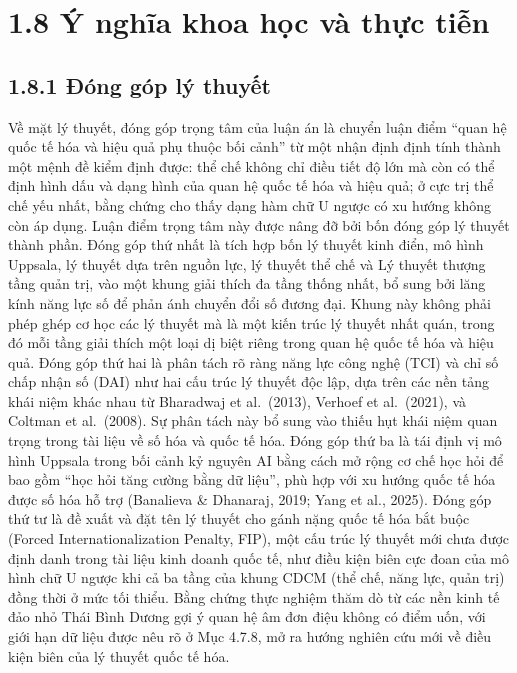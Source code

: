 \documentclass[
  a4paper,
  13pt]{extreport}
\begin{document}
\hypertarget{uxfd-nghux129a-khoa-hux1ecdc-vuxe0-thux1ef1c-tiux1ec5n}{%
\section{1.8 Ý nghĩa khoa học và thực
tiễn}\label{uxfd-nghux129a-khoa-hux1ecdc-vuxe0-thux1ef1c-tiux1ec5n}}

\hypertarget{ux111uxf3ng-guxf3p-luxfd-thuyux1ebft}{%
\subsection{1.8.1 Đóng góp lý
thuyết}\label{ux111uxf3ng-guxf3p-luxfd-thuyux1ebft}}

Về mặt lý thuyết, đóng góp trọng tâm của luận án là chuyển luận điểm
``quan hệ quốc tế hóa và hiệu quả phụ thuộc bối cảnh'' từ một nhận định
định tính thành một mệnh đề kiểm định được: thể chế không chỉ điều tiết
độ lớn mà còn có thể định hình dấu và dạng hình của quan hệ quốc tế hóa
và hiệu quả; ở cực trị thể chế yếu nhất, bằng chứng cho thấy dạng hàm
chữ U ngược có xu hướng không còn áp dụng. Luận điểm trọng tâm này được
nâng đỡ bởi bốn đóng góp lý thuyết thành phần. Đóng góp thứ nhất là tích
hợp bốn lý thuyết kinh điển, mô hình Uppsala, lý thuyết dựa trên nguồn
lực, lý thuyết thể chế và Lý thuyết thượng tầng quản trị, vào một khung
giải thích đa tầng thống nhất, bổ sung bởi lăng kính năng lực số để phản
ánh chuyển đổi số đương đại. Khung này không phải phép ghép cơ học các
lý thuyết mà là một kiến trúc lý thuyết nhất quán, trong đó mỗi tầng
giải thích một loại dị biệt riêng trong quan hệ quốc tế hóa và hiệu quả.
Đóng góp thứ hai là phân tách rõ ràng năng lực công nghệ (TCI) và chỉ số
chấp nhận số (DAI) như hai cấu trúc lý thuyết độc lập, dựa trên các nền
tảng khái niệm khác nhau từ Bharadwaj et al.~(2013), Verhoef et
al.~(2021), và Coltman et al.~(2008). Sự phân tách này bổ sung vào thiếu
hụt khái niệm quan trọng trong tài liệu về số hóa và quốc tế hóa. Đóng
góp thứ ba là tái định vị mô hình Uppsala trong bối cảnh kỷ nguyên AI
bằng cách mở rộng cơ chế học hỏi để bao gồm ``học hỏi tăng cường bằng dữ
liệu'', phù hợp với xu hướng quốc tế hóa được số hóa hỗ trợ (Banalieva
\& Dhanaraj, 2019; Yang et al., 2025). Đóng góp thứ tư là đề xuất và đặt
tên lý thuyết cho gánh nặng quốc tế hóa bắt buộc (Forced
Internationalization Penalty, FIP), một cấu trúc lý thuyết mới chưa được
định danh trong tài liệu kinh doanh quốc tế, như điều kiện biên cực đoan
của mô hình chữ U ngược khi cả ba tầng của khung CDCM (thể chế, năng
lực, quản trị) đồng thời ở mức tối thiểu. Bằng chứng thực nghiệm thăm dò
từ các nền kinh tế đảo nhỏ Thái Bình Dương gợi ý quan hệ âm đơn điệu
không có điểm uốn, với giới hạn dữ liệu được nêu rõ ở Mục 4.7.8, mở ra
hướng nghiên cứu mới về điều kiện biên của lý thuyết quốc tế hóa.
\end{document}

